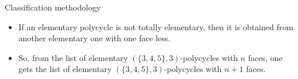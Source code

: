 \documentclass[%
pdf,
colorBG,
slideColor,
]{prosper}
\begin{document}
\begin{slide}{Classification methodology}
\begin{itemize}
\item If an elementary polycycle is not totally elementary, then it is obtained from another elementary one with one face less.
\item So, from the list of elementary $(\{3,4,5\},3)$-polycycles with $n$ faces, one gets the list of elementary $(\{3,4,5\}, 3)$-polycycles with $n+1$ faces.
\begin{center}
\par
\end{center}

\end{itemize}
\end{slide}
\end{document}
